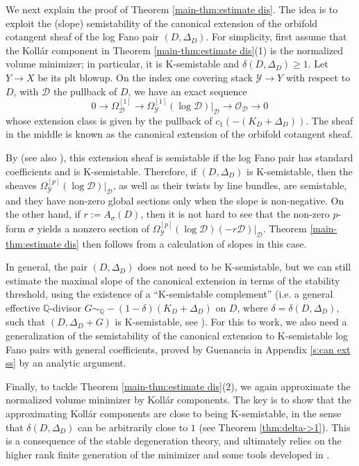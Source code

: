 \documentclass[12pt]{amsart}
\theoremstyle{definition}
\newcommand{\bQ}{\mathbb{Q}}
\newcommand{\cY}{\mathcal{Y}}
\newcommand{\cD}{\mathcal{D}}
\numberwithin{equation}{section}
\begin{document}
We next explain the proof of Theorem \ref{main-thm:estimate dis}. The idea is to exploit the (slope) semistability of the canonical extension of the orbifold cotangent sheaf of the log Fano pair $(D,\Delta_D)$. For simplicity, first assume that the Koll\'ar component in Theorem \ref{main-thm:estimate dis}(1) is the normalized volume minimizer; in particular, it is K-semistable and $\delta(D,\Delta_D)\ge 1$. Let $Y\to X$ be its plt blowup. On the index one covering stack $\cY\to Y$ with respect to $D$, with $\cD$ the pullback of $D$, we have an exact sequence
\[
0\to  \Omega^{[1]}_{\cD} \to \Omega^{[1]}_{\cY}(\log \cD)|_{\cD} \to  \mathcal{O}_{\cD} \to 0\,
\]
whose extension class is given by the pullback of $c_1(-(K_D+\Delta_D))$. The sheaf in the middle is known as the canonical extension of the orbifold cotangent sheaf. 

By \cite{DGP-Q-Fano-decomp,Dai-stability} (see also \cite{Tian-extension,Li-extension-stab}), this extension sheaf is semistable if the log Fano pair has standard coefficients and is K-semistable. Therefore, if $(D,\Delta_D)$ is K-semistable, then the sheaves $\Omega^{[p]}_{\cY}(\log \cD)|_{\cD}$, as well as their twists by line bundles, are semistable, and they have non-zero global sections only when the slope is non-negative. On the other hand, if $r:=A_{\sigma}(D)$, then it is not hard to see that the non-zero $p$-form $\sigma$ yields a nonzero section of $\Omega^{[p]}_{\cY}(\log \cD)(-r\cD)|_{\cD}$. Theorem \ref{main-thm:estimate dis} then follows from a calculation of slopes in this case. 

In general, the pair $(D,\Delta_D)$ does not need to be K-semistable, but we can still estimate the maximal slope of the canonical extension in terms of the stability threshold, using the existence of a ``K-semistable complement'' (i.e. a general effective $\bQ$-divisor $G\sim_{\mathbb Q}-(1-\delta)(K_D+\Delta_D)$ on $D$, where $\delta=\delta(D,\Delta_D)$, such that $(D,\Delta_D+G)$ is K-semistable, see \cite[Theorem 1.8]{LXZ-HRFG}). For this to work, we also need a generalization of the semistability of the canonical extension to K-semistable log Fano pairs with general coefficients, proved by Guenancia in Appendix \ref{s:can ext ss} by an analytic argument.

Finally, to tackle Theorem \ref{main-thm:estimate dis}(2), we again approximate the normalized volume minimizer by Koll\'ar components. The key is to show that the approximating Koll\'ar components are close to being K-semistable, in the sense that $\delta(D,\Delta_D)$ can be arbitrarily close to $1$ (see Theorem \ref{thm:delta->1}). This is a consequence of the stable degeneration theory, and ultimately relies on the higher rank finite generation of the minimizer \cite{XZ-SDC} and some tools developed in \cite{XZ-uniqueness}.
\end{document}
